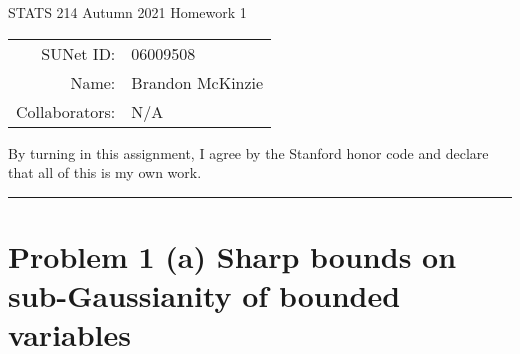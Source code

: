 \documentclass[11pt]{article}
\newcommand{\1}{\mathbb{I}} %
\begin{document}
	
	\begin{center}
		{\Large STATS 214 Autumn 2021 Homework 1}
		
		\begin{tabular}{rl}
			SUNet ID: & 06009508 \\
			Name: & Brandon McKinzie \\
			Collaborators: & N/A
		\end{tabular}
	\end{center}
	
	\p By turning in this assignment, I agree by the Stanford honor code and declare
	that all of this is my own work.
	
	\rule{\linewidth}{0.4pt}
	
\section*{Problem 1 (a) Sharp bounds on sub-Gaussianity of bounded variables}

\end{document}
